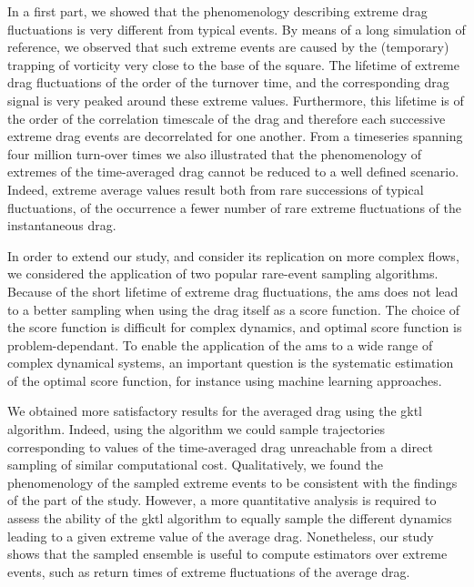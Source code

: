 \documentclass{jfm}
\begin{document}
In a first part, we showed that the phenomenology describing extreme drag fluctuations is very different from typical events.
By means of a long simulation of reference, we observed that such extreme events are caused by the (temporary) trapping of vorticity very close to the base of the square.
The lifetime of extreme drag fluctuations of the order of the turnover time, and the corresponding drag signal is very peaked around these extreme values.
Furthermore, this lifetime is of the order of the correlation timescale of the drag and therefore each successive extreme drag events are decorrelated for one another.
From a timeseries spanning four million turn-over times we also illustrated that the phenomenology of extremes of the time-averaged drag cannot be reduced to a well defined scenario.
Indeed, extreme average values result both from rare successions of typical fluctuations, of the occurrence a fewer number of rare extreme fluctuations of the instantaneous drag.

In order to extend our study, and consider its replication on more complex flows, we considered the application of two popular rare-event sampling algorithms.
Because of the short lifetime of extreme drag fluctuations, the \ac{ams} does not lead to a better sampling
when using the drag itself as a score function.
The choice of the score function is difficult for complex dynamics, and optimal score function is problem-dependant.
To enable the application of the \ac{ams} to a wide range of complex dynamical systems, an important question is the systematic estimation of the optimal score function, for instance using machine learning approaches.

We obtained more satisfactory results for the averaged drag using the \ac{gktl} algorithm.
Indeed, using the algorithm we could sample trajectories corresponding to values of the time-averaged drag unreachable from a direct sampling of similar computational cost.
Qualitatively, we found the phenomenology of the sampled extreme events to be consistent with the findings of the part of the study.
However, a more quantitative analysis is required to assess the ability of the \ac{gktl} algorithm to equally sample the different dynamics leading to a given extreme value of the average drag.
Nonetheless, our study shows that the sampled ensemble is useful to compute estimators over extreme events, such as return times of extreme fluctuations of the average drag.
\end{document}
